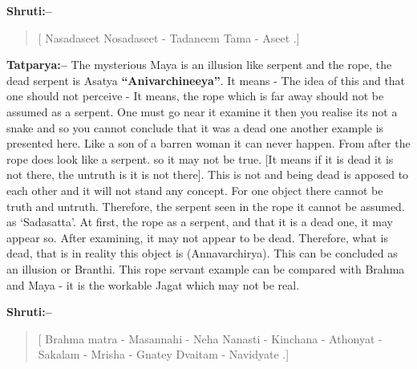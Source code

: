 \textbf{Shruti:–}

\begin{verse}
[ Nasadaseet Nosadaseet - Tadaneem Tama - Aseet .]
\end{verse}

\textbf{Tatparya:–} The mysterious Maya is an illusion like serpent and the rope, the dead serpent is Asatya \textbf{“Anivarchineeya”}. It means - The idea of this and that one should not perceive - It means, the rope which is far away should not be assumed as a serpent. One must go near it examine it then you realise its not a snake and so you cannot conclude that it was a dead one another example is presented here. Like a son of a barren woman it can never happen. From after the rope does look like a serpent. so it may not be true. [It means if it is dead it is not there, the untruth is it is not there]. This is not and being dead is apposed to each other and it will not stand any concept. For one object there cannot be truth and untruth. Therefore, the serpent seen in the rope it cannot be assumed. as ‘Sadasatta’. At first, the rope as a serpent, and that it is a dead one, it may appear so. After examining, it may not appear to be dead. Therefore, what is dead, that is in reality this object is (Annavarchirya). This can be concluded as an illusion or Branthi. This rope servant example can be compared with Brahma and Maya - it is the workable Jagat which may not be real.

\textbf{Shruti:–}

\begin{verse}
[ Brahma matra - Masannahi - Neha Nanasti - Kinchana - Athonyat - Sakalam - Mrisha - Gnatey Dvaitam - Navidyate .]
\end{verse}

